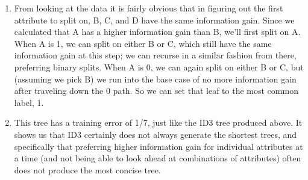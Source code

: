 \documentclass[11pt]{article}
\begin{document}
\begin {enumerate}
\begin {enumerate}
\item
From looking at the data it is fairly obvious that in figuring out the first attribute to split on, B, C, and D have the same information gain. Since we calculated that A has a higher information gain than B, we'll first split on A. When A is 1, we can split on either B or C, which still have the same information gain at this step; we can recurse in a similar fashion from there, preferring binary splits. When A is 0, we can again split on either B or C, but (assuming we pick B) we run into the base case of no more information gain after traveling down the 0 path. So we can set that leaf to the most common label, 1.

\begin{center}
\end{center}


\item %
This tree has a training error of 1/7, just like the ID3 tree produced above. It shows us that ID3 certainly does not always generate the shortest trees, and specifically that preferring higher information gain for individual attributes at a time (and not being able to look ahead at combinations of attributes) often does not produce the most concise tree.


\end{enumerate}
\end{enumerate}
\end{document}
